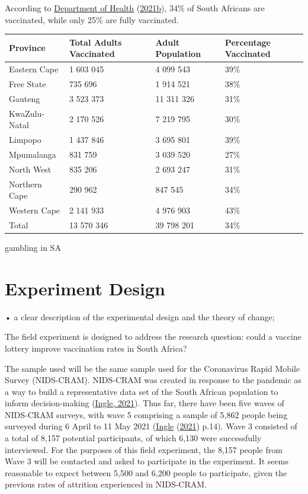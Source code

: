 \documentclass[11pt,preprint, authoryear]{elsarticle}
\let\origtable\table
\let\endorigtable\endtable
\renewenvironment{table}[1][2] {
    \expandafter\origtable\expandafter[H]
} {
    \endorigtable
}
\numberwithin{equation}{section}
\numberwithin{figure}{section}
\numberwithin{table}{section}
\begin{document}
According to \protect\hyperlink{ref-stat}{Department of Health}
(\protect\hyperlink{ref-stat}{2021b}), 34\% of South Africans are
vaccinated, while only 25\% are fully vaccinated.

\begin{table}[H]
\centering
\begin{tabular}{llll}
  \toprule
Province & Total Adults Vaccinated & Adult Population & Percentage Vaccinated \\ 
  \midrule
Eastern Cape & 1 603 045 & 4 099 543 & 39\% \\ 
  Free State & 735 696 & 1 914 521 & 38\% \\ 
  Gauteng & 3 523 373 & 11 311 326 & 31\% \\ 
  KwaZulu-Natal & 2 170 526 & 7 219 795 & 30\% \\ 
  Limpopo & 1 437 846 & 3 695 801 & 39\% \\ 
  Mpumalanga & 831 759 & 3 039 520 & 27\% \\ 
  North West & 835 206 & 2 693 247 & 31\% \\ 
  Northern Cape & 290 962 & 847 545 & 34\% \\ 
  Western Cape & 2 141 933 & 4 976 903 & 43\% \\ 
  Total & 13 570 346 & 39 798 201 & 34\% \\ 
   \bottomrule
\end{tabular}
\caption{Vaccination Statistics \label{tab1}} 
\end{table}

gambling in SA

\hypertarget{experiment-design}{%
\section{\texorpdfstring{Experiment Design
\label{design}}{Experiment Design }}\label{experiment-design}}

• a clear description of the experimental design and the theory of
change;

The field experiment is designed to address the research question: could
a vaccine lottery improve vaccination rates in South Africa?

The sample used will be the same sample used for the Coronavirus Rapid
Mobile Survey (NIDS-CRAM). NIDS-CRAM was created in response to the
pandemic as a way to build a representative data set of the South
African population to inform decision-making
(\protect\hyperlink{ref-nids}{Ingle, 2021}). Thus far, there have been
five waves of NIDS-CRAM surveys, with wave 5 comprising a sample of
5,862 people being surveyed during 6 April to 11 May 2021
(\protect\hyperlink{ref-nids}{Ingle}
(\protect\hyperlink{ref-nids}{2021}) p.14). Wave 3 consisted of a total
of 8,157 potential participants, of which 6,130 were successfully
interviewed. For the purposes of this field experiment, the 8,157 people
from Wave 3 will be contacted and asked to participate in the
experiment. It seems reasonable to expect between 5,500 and 6,200 people
to participate, given the previous rates of attrition experienced in
NIDS-CRAM.
\end{document}
